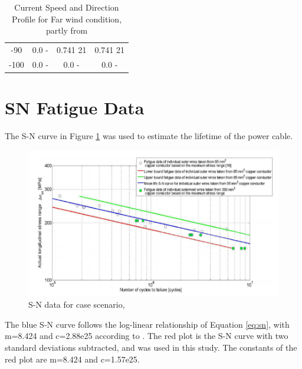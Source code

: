 \begin{table} [H]
\begin{tabular}{ |c|c|c|c|}
 -90 & 0.0 \hspace{0.7cm} - & 0.741 \hspace{0.7cm} 21  & 0.741 \hspace{1.15cm} 21 \\ 
 -100 & 0.0 \hspace{0.7cm} - & 0.0 \hspace{0.7cm} -  & 0.0 \hspace{1.15cm} - \\ 
 \hline
\end{tabular}
\caption{Current Speed and Direction Profile for Far wind condition, partly from \cite{Lifes50+D1.1}}
\label{table:tidcurfar}
\end{table} 

\section{SN Fatigue Data}
The S-N curve in Figure \ref{fig:snplot} was used to estimate the lifetime of the power cable. 

\begin{figure}[H]
\centering
\includegraphics[scale=0.6]{figures/SNplot}
\caption[$\; \:$S-N data]{S-N data for case scenario,\cite{s300} }
 \label{fig:snplot}
\end{figure}
\noindent The blue S-N curve follows the log-linear relationship of Equation \ref{eq:sn}, with m=8.424 and c=2.88e25  according to \cite{Nasution2013}. The red plot is the S-N curve with two standard deviations subtracted, and was used in this study. The constants of the red plot are m=8.424 and c=1.57e25. 